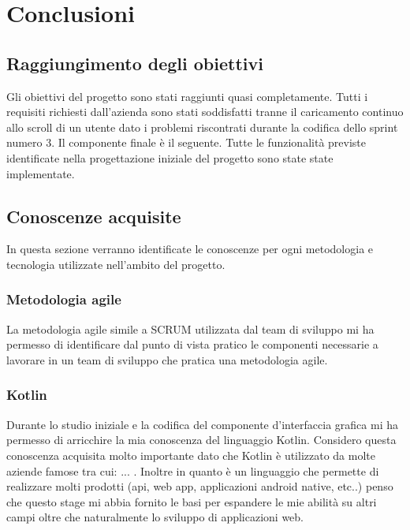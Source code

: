 
\chapter{Conclusioni}
\label{cap:conclusioni}
\section{Raggiungimento degli obiettivi}
Gli obiettivi del progetto sono stati raggiunti quasi completamente. Tutti i requisiti richiesti dall'azienda sono stati soddisfatti tranne il caricamento continuo allo scroll di un utente dato i problemi riscontrati durante la codifica dello sprint numero 3.
Il componente finale è il seguente. Tutte le funzionalità previste identificate nella progettazione iniziale del progetto sono state state implementate.
\section{Conoscenze acquisite}
In questa sezione verranno identificate le conoscenze per ogni metodologia e tecnologia utilizzate nell'ambito del progetto.

\subsection{Metodologia agile}
La metodologia agile simile a SCRUM utilizzata dal team di sviluppo mi ha permesso di identificare dal punto di vista pratico le componenti necessarie a lavorare in un team di sviluppo che pratica una metodologia agile.

\subsection{Kotlin}
Durante lo studio iniziale e la codifica del componente d'interfaccia grafica mi ha permesso di arricchire la mia conoscenza del linguaggio Kotlin. Considero questa conoscenza acquisita molto importante dato che Kotlin è utilizzato da molte aziende famose tra cui: ... . Inoltre in quanto è un linguaggio che permette di realizzare molti prodotti (api, web app, applicazioni android native, etc..) penso che questo stage mi abbia fornito le basi per espandere le mie abilità su altri campi oltre che naturalmente lo sviluppo di applicazioni web.

